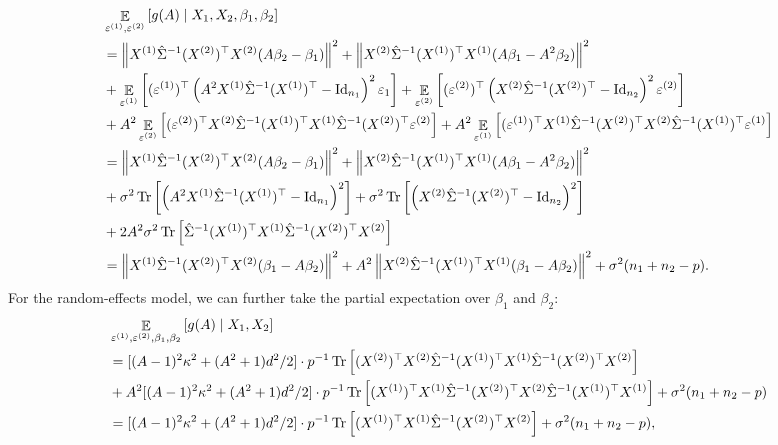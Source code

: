 \begin{align*}	
&\mathop{\mathbb{E}}_{\varepsilon^{(1)}, \varepsilon^{(2)}}\left[ g(A) \mid X_1, X_2 ,\beta_1,\beta_2 \right] \\
&= \left\| X^{(1)} \hat \Sigma^{-1} (X^{(2)})^\top X^{(2)} (A\beta_2-\beta_1)\right\|^2 +\left\| X^{(2)} \hat \Sigma^{-1} (X^{(1)})^\top X^{(1)} (A\beta_1-A^2\beta_2)\right\|^2  \\
& + \mathop{\mathbb{E}}_{\varepsilon^{(1)}}\left[ (\varepsilon^{(1)})^\top \left(A^2 X^{(1)}\hat \Sigma^{-1} (X^{(1)})^\top-\operatorname{Id}_{n_1}\right)^2\varepsilon_1 \right] +\mathop{\mathbb{E}}_{ \varepsilon^{(2)}}\left[ (\varepsilon^{(2)})^\top \left(X^{(2)}\hat \Sigma^{-1} (X^{(2)})^\top-\operatorname{Id}_{n_2}\right)^2\varepsilon^{(2)} \right]   \\
&+  A^2 \mathop{\mathbb{E}}_{ \varepsilon^{(2)}}\left[  (\varepsilon^{(2)} )^\top X^{(2)} \hat \Sigma^{-1}  (X^{(1)})^\top X^{(1)}\hat \Sigma^{-1} (X^{(2)})^\top \varepsilon^{(2)} \right]  +A^2 \mathop{\mathbb{E}}_{ \varepsilon^{(1)}}\left[  (\varepsilon^{(1)})^\top X^{(1)} \hat \Sigma^{-1}  (X^{(2)})^\top X^{(2)}\hat \Sigma^{-1} (X^{(1)})^\top \varepsilon^{(1)}   \right]\\
		&= \left\| X^{(1)} \hat \Sigma^{-1} (X^{(2)})^\top X^{(2)} (A\beta_2-\beta_1)\right\|^2 +\left\| X^{(2)} \hat \Sigma^{-1} (X^{(1)})^\top X^{(1)} (A\beta_1-A^2\beta_2)\right\|^2  \\
		&+ \sigma^2\operatorname{Tr}\left[ \left(A^2 X^{(1)}\hat \Sigma^{-1} (X^{(1)})^\top-\operatorname{Id}_{n_1}\right)^2\right] +\sigma^2\operatorname{Tr}\left[ \left(X^{(2)}\hat \Sigma^{-1} (X^{(2)})^\top-\operatorname{Id}_{n_2}\right)^2 \right]\\
&+ 2 A^2 \sigma^2 \operatorname{Tr}\left[ \hat \Sigma^{-1}  (X^{(1)})^\top X^{(1)}\hat \Sigma^{-1} (X^{(2)})^\top X^{(2)} \right]  \nonumber\\
		& = \left\| X^{(1)} \hat \Sigma^{-1} (X^{(2)})^\top X^{(2)} (\beta_1-A\beta_2)\right\|^2 +A^2\left\| X^{(2)} \hat \Sigma^{-1} (X^{(1)})^\top X^{(1)} (\beta_1-A\beta_2)\right\|^2 +\sigma^2(n_1+n_2-p).
\end{align*}
For the random-effects model, we can further take the partial expectation over $\beta_1$ and $\beta_2$: 
\begin{align*}	
&\mathop{\mathbb{E}}_{\varepsilon^{(1)}, \varepsilon^{(2)} ,\beta_1,\beta_2}\left[ g(A) \mid X_1, X_2 \right] \\
&=[(A-1)^2\kappa^2 + (A^2+1)d^2/2] \cdot p^{-1}\operatorname{Tr}\left[  (X^{(2)})^\top X^{(2)} \hat \Sigma^{-1}(X^{(1)})^\top X^{(1)} \hat \Sigma^{-1} (X^{(2)})^\top X^{(2)}\right]\\
&+ A^2[(A-1)^2\kappa^2 + (A^2+1)d^2/2] \cdot p^{-1}\operatorname{Tr}\left[  (X^{(1)})^\top X^{(1)} \hat \Sigma^{-1}(X^{(2)})^\top X^{(2)} \hat \Sigma^{-1} (X^{(1)})^\top X^{(1)}\right] +\sigma^2(n_1+n_2-p)\\
&=[(A-1)^2\kappa^2 + (A^2+1)d^2/2] \cdot p^{-1} \operatorname{Tr}\left[ (X^{(1)})^\top X^{(1)} \hat \Sigma^{-1}(X^{(2)})^\top X^{(2)}\right]+\sigma^2(n_1+n_2-p),
\end{align*}
